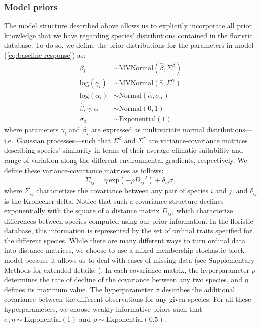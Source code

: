 \documentclass[11pt, a4paper]{article}
\begin{document}
\subsubsection*{Model priors}
The model structure described above allows us to explicitly incorporate all prior knowledge that we have regarding species' distributions contained in the floristic database. To do so, we define the prior distributions for the parameters in model (\ref{eq:baseline-response}) as:
\begin{equation} 
\begin{split}
\beta_{i}  & \sim \text{MVNormal}\left(\hat{\beta}, \Sigma^{\beta}\right)\\
\text{log}(\gamma_{i})  & \sim \text{MVNormal}\left(\hat{\gamma}, \Sigma^{\gamma}\right)\\
\text{log}(\alpha_{i}) & \sim \text{Normal}\left(\hat{\alpha}, \sigma_{\alpha}\right)\\
\hat{\beta}, 
\hat{\gamma}, 
\hat{\alpha}  & \sim \text{Normal}\left(0,1\right)\\
\sigma_{\alpha}  & \sim \text{Exponential}\left(1\right)
\end{split}
\label{eq:baseline-priors}
\end{equation} 
where parameters $\gamma_i$ and $\beta_i$ are expressed as multivariate normal distributions---i.e.~Gaussian processes---such that $\Sigma^{\beta}$ and $\Sigma^{\gamma}$ are variance-covariance matrices describing species' similarity in terms of their average climatic suitability and range of variation along the different environmental gradients, respectively. We define these variance-covariance matrices as follows:
\begin{equation} 
\Sigma_{ij} = \eta\,\text{exp}\left(-\rho {D_{ij}}^2\right) + \delta_{ij} \sigma ,
\label{eq:covariance-baseline}
\end{equation}
where $\Sigma_{ij}$ characterizes the covariance between any pair of species $i$ and $j$, and $\delta_{ij}$ is the Kronecker delta. Notice that such a covariance structure declines exponentially with the square of a distance matrix $D_{ij}$, which characterize differences between species computed using our prior information. In the floristic database, this information is represented by the set of ordinal traits specified for the different species. While there are many different ways to turn ordinal data into distance matrices, we choose to use a mixed-membership stochastic block model because it allows us to deal with cases of missing data (see Supplementary Methods for extended details; \citealt{godoy-loriteAccurateScalableSocial2016}). In each covariance matrix, the hyperparameter $\rho$ determines the rate of decline of the covariance between any two species, and $\eta$ defines its maximum value. The hyperparameter $\sigma$ describes the additional covariance between the different observations for any given species. For all these hyperparameters, we choose weakly informative priors such that $\sigma , \eta \sim \text{Exponential}\left(1\right)$ and $\rho\sim \text{Exponential}\left(0.5\right)$.
\end{document}
